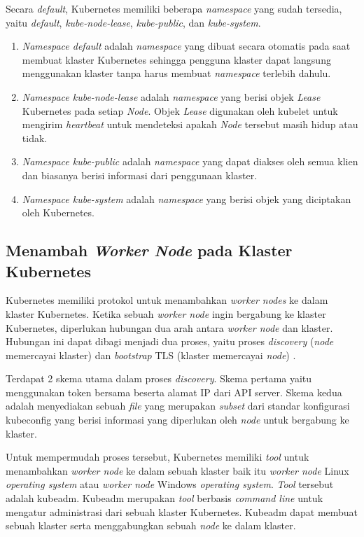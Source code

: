 Secara \emph{default}, Kubernetes memiliki beberapa \emph{namespace} yang sudah
tersedia, yaitu \emph{default}, \emph{kube-node-lease}, \emph{kube-public}, dan \emph{kube-system}.

\begin{enumerate}[itemsep=-0.2cm, topsep=-0.3cm]
  \item{\emph{Namespace default} adalah \emph{namespace} yang dibuat secara otomatis
      pada saat membuat klaster Kubernetes sehingga pengguna klaster dapat langsung
      menggunakan klaster tanpa harus membuat \emph{namespace} terlebih dahulu.
    }
  \item{\emph{Namespace kube-node-lease} adalah \emph{namespace} yang berisi objek \emph{Lease}
      Kubernetes pada setiap \emph{Node}. Objek \emph{Lease} digunakan oleh kubelet untuk
      mengirim \emph{heartbeat} untuk mendeteksi apakah \emph{Node} tersebut masih hidup atau tidak.
    }
  \item{\emph{Namespace kube-public} adalah \emph{namespace} yang dapat diakses oleh semua
      klien dan biasanya berisi informasi dari penggunaan klaster.
    }
  \item{\emph{Namespace kube-system} adalah \emph{namespace} yang berisi objek yang diciptakan
      oleh Kubernetes.
    }
\end{enumerate}

\subsection{Menambah \emph{Worker Node} pada Klaster Kubernetes}

Kubernetes memiliki protokol untuk menambahkan \emph{worker nodes} ke dalam klaster Kubernetes.
Ketika sebuah \emph{worker node} ingin bergabung ke klaster Kubernetes, diperlukan hubungan
dua arah antara \emph{worker node} dan klaster. Hubungan ini dapat dibagi menjadi dua proses, yaitu
proses \emph{discovery} (\emph{node} memercayai klaster) dan \emph{bootstrap} TLS (klaster memercayai \emph{node}) \parencite{kubernetes-website-adding-linux-node}.

Terdapat 2 skema utama dalam proses \emph{discovery}. Skema pertama yaitu menggunakan token bersama beserta
alamat IP dari API server. Skema kedua adalah menyediakan sebuah \emph{file} yang merupakan
\emph{subset} dari standar konfigurasi kubeconfig yang berisi informasi yang diperlukan oleh
\emph{node} untuk bergabung ke klaster.

Untuk mempermudah proses tersebut, Kubernetes memiliki \emph{tool} untuk menambahkan \emph{worker node} ke dalam sebuah klaster
baik itu \emph{worker node} Linux \emph{operating system} atau \emph{worker node} Windows \emph{operating system}.
\emph{Tool} tersebut adalah kubeadm. Kubeadm merupakan \emph{tool} berbasis \emph{command line} untuk mengatur administrasi dari sebuah klaster
Kubernetes. Kubeadm dapat membuat sebuah klaster serta menggabungkan sebuah \emph{node} ke dalam klaster.

